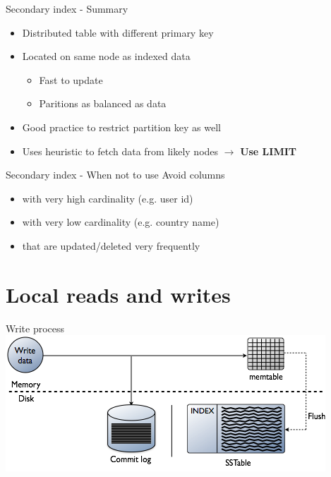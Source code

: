 \documentclass[
  10pt
]{beamer}
\begin{document}
\begin{frame}{Secondary index - Summary}
  \begin{itemize}
    \item<1-> Distributed table with different primary key
    \item<2-> Located on same node as indexed data
      \begin{itemize}
        \item Fast to update
        \item Paritions as balanced as data
      \end{itemize}
    \item<3-> Good practice to restrict partition key as well
    \item<4-> Uses heuristic to fetch data from likely nodes $\rightarrow$ \textbf{Use LIMIT}
  \end{itemize}
\end{frame}

\begin{frame}{Secondary index - When not to use}
  Avoid columns
  \begin{itemize}
    \item<1-> with very high cardinality (e.g. user id)
    \item<2-> with very low cardinality (e.g. country name)
    \item<3-> that are updated/deleted very frequently
  \end{itemize}
\end{frame}

\section{Local reads and writes}  %
\begin{frame}{Write process}
  \includegraphics[width=\textwidth]{resources/local_write.png}
\end{frame}
\end{document}
